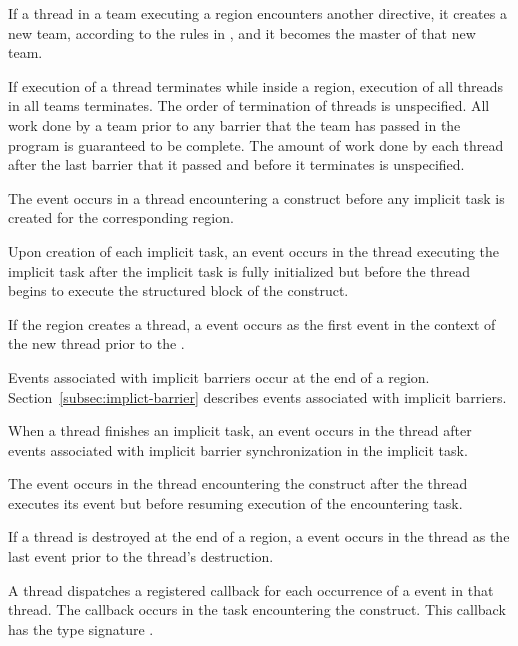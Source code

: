 If a thread in a team executing a  region encounters another 
directive, it creates a new team, according to the rules in
,
and it becomes the master of that new team.

If execution of a thread terminates while inside a  region, execution of all
threads in all teams terminates. The order of termination of threads is unspecified. All
work done by a team prior to any barrier that the team has passed in the program is
guaranteed to be complete. The amount of work done by each thread after the last
barrier that it passed and before it terminates is unspecified.

\events

The  event occurs in a thread encountering a
 construct before any implicit task is created for the
corresponding  region.

Upon creation of each implicit task, an  event
occurs in the thread executing the implicit task after the implicit
task is fully initialized but before the thread begins to execute the
structured block of the  construct.

If the  region creates a thread, a 
event occurs as the first event in the context of the new thread
prior to the
.

Events associated with implicit barriers occur at the end of a
 region. Section~\ref{subsec:implict-barrier} describes events
associated with implicit barriers.

When a thread finishes an implicit task, an 
event occurs in the thread after events associated with implicit
barrier synchronization in the implicit task.

The  event occurs in the thread encountering the
 construct after the thread
executes its  event
but before resuming execution of the encountering task.

If a thread is destroyed at the end of a  region, a
 event occurs in the thread as the last
event prior to the thread's destruction.

\tools

A thread dispatches a registered 
callback for each occurrence of a  event in that
thread.  The callback occurs in the task encountering
the  construct.  This callback has the type signature
.


